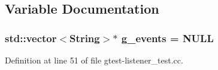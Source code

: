 \subsection{\-Variable \-Documentation}
\hypertarget{gtest-listener__test_8cc_a0206e6dfe3da7c39b78bdc2492c08c6d}{
\subsubsection[{g\-\_\-events}]{\setlength{\rightskip}{0pt plus 5cm}std\-::vector$<$\-String$>$$\ast$ {\bf g\-\_\-events} = \-N\-U\-L\-L}}\label{de/d83/gtest-listener__test_8cc_a0206e6dfe3da7c39b78bdc2492c08c6d}


\-Definition at line 51 of file gtest-\/listener\-\_\-test.\-cc.

